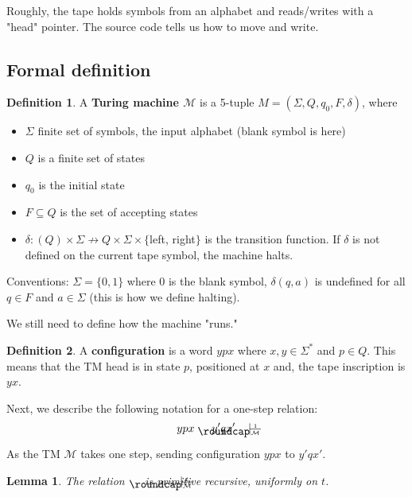 \documentclass[11pt]{article}
\DeclareRobustCommand{\xvdash}[2][]{\mathrel{\drawxvdash{#1}{#2}}}
\newcommand{\drawxvdash}[2]{%
  \vcenter{\hbox{%
    \setlength{\unitlength}{1em}%
    \begin{picture}(1,1)
    \roundcap
    \put(0,0){\line(0,1){1}}
    \put(0,0.5){\line(1,0){1}}
    \put(0.5,0){\makebox[0pt]{\text{\smaller$\scriptscriptstyle#2$}}}
    \put(0.5,0.6){\makebox[0pt]{\text{\smaller$\scriptscriptstyle#1$}}}
    \end{picture}%
  }}%
}
\theoremstyle{plain}
\newtheorem{lem}{Lemma}
\theoremstyle{definition}
\newtheorem*{defn}{Definition}
\begin{document}
Roughly, the tape holds symbols from an alphabet and reads/writes with a "head" pointer. The source code tells us how to move and write.

\subsection{Formal definition}

\begin{defn}
	A {\bf Turing machine $\mathcal{M}$} is a 5-tuple $M = (\Sigma, Q, q_0, F, \delta)$, where
	\begin{itemize}
		\item $\Sigma$ finite set of symbols, the input alphabet (blank symbol is here)
		\item $Q$ is a finite set of states
		\item $q_0$ is the initial state
		\item $F \subseteq Q$ is the set of accepting states
		\item $\delta: (Q) \times \Sigma \nrightarrow Q \times \Sigma \times \{$left, right$\}$ is the transition function. If $\delta$
		      is not defined on the current tape symbol, the machine halts.
	\end{itemize}
\end{defn}

Conventions: $\Sigma = \{0, 1\}$ where 0 is the blank symbol, $\delta(q, a)$ is undefined for all $q \in F$ and $a \in \Sigma$ (this is
how we define halting).

We still need to define how the machine "runs."

\begin{defn}
	A {\bf configuration} is a word $ypx$ where $x, y \in \Sigma^*$ and $p \in Q$. This means that the TM head is in state $p$,
	positioned at $x$ and, the tape inscription is $yx$.
\end{defn}

Next, we describe the following notation for a one-step relation:
$$ypx\xvdash[1]{\mathcal{M}}y'qx'$$

As the TM $\mathcal{M}$ takes one step, sending configuration $ypx$ to $y'qx'$.

\begin{lem}
	The relation $\xvdash[t]{\mathcal{M}}$ is primitive recursive, uniformly on $t$.
\end{lem}
\end{document}
